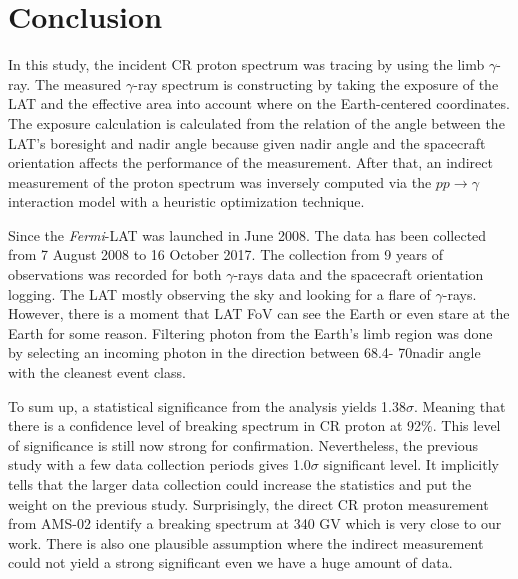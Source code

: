 \chapter{Conclusion}


In this study, the incident CR proton spectrum was tracing by 
using the limb $\gamma$-ray. The measured $\gamma$-ray spectrum
is constructing by taking the exposure of the LAT and
the effective area into account where on the Earth-centered 
coordinates. The exposure calculation is calculated from the 
relation of the angle between the LAT's boresight and nadir angle 
because given nadir angle and the spacecraft orientation affects the 
performance of the measurement. After that, an indirect measurement 
of the proton spectrum was inversely computed via the
$pp\rightarrow\gamma$ interaction model with a heuristic optimization
technique.


Since the \textit{Fermi}-LAT was launched in June 2008.
The data has been collected from 7 August 2008 to 16 October 2017.
The collection from 9 years of observations was recorded for both 
$\gamma$-rays data and the spacecraft orientation logging.
The LAT mostly observing the sky and looking for a flare of $\gamma$-rays.
However, there is a moment that LAT FoV can see the Earth or even stare at the Earth for some reason.
Filtering photon from the Earth's limb region was done by selecting 
an incoming photon in the direction between 68.4\textdegree -
70\textdegree nadir angle with the cleanest event class.




To sum up, a statistical significance from the analysis yields 
1.38$\sigma$. Meaning that there is a confidence level of breaking
spectrum in CR proton at 92\%. This level of significance is still 
now strong for confirmation. Nevertheless, the previous 
study with a few data collection periods gives 1.0$\sigma$ significant
level. It implicitly tells that the larger data collection could 
increase the statistics and put the weight on the previous study.
Surprisingly, the direct CR proton measurement from AMS-02 identify 
a breaking spectrum at 340 GV which is very close to our work.
There is also one plausible assumption where the indirect measurement
could not yield a strong significant even we have a huge amount of data.

